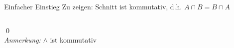 \begin{frame}{Einfacher Einstieg}
    \onslide
    Zu zeigen: Schnitt ist kommutativ, d.h. $A \cap B = B \cap A$
    \begin{columns}
    \end{columns}
    \qed\\
    \small{\emph{Anmerkung:} $\wedge$ ist kommutativ}
\end{frame}

